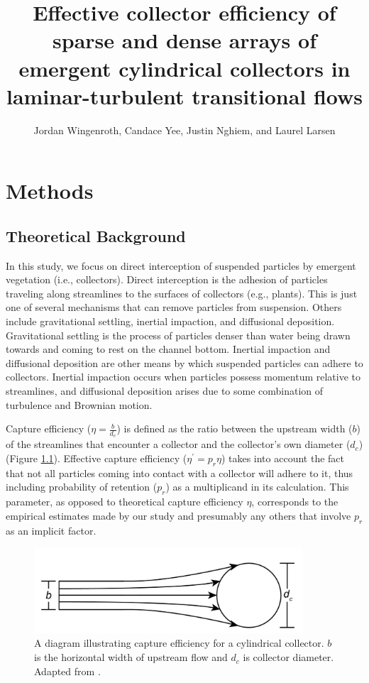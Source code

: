 \documentclass{scrreprt}
\author{Jordan Wingenroth, Candace Yee, Justin Nghiem, and Laurel Larsen}
\title{Effective collector efficiency of sparse and dense arrays of emergent cylindrical collectors in laminar-turbulent transitional flows}
\begin{document}
\maketitle

%

\setcounter{chapter}{1}

\chapter{Methods}

\section{Theoretical Background}

In this study, we focus on direct interception of suspended particles by emergent vegetation (i.e., collectors). Direct interception is the adhesion of particles traveling along streamlines to the surfaces of collectors (e.g., plants). This is just one of several mechanisms that can remove particles from suspension. Others include gravitational settling, inertial impaction, and diffusional deposition. Gravitational settling is the process of particles denser than water being drawn towards and coming to rest on the channel bottom. Inertial impaction and diffusional deposition are other means by which suspended particles can adhere to collectors. Inertial impaction occurs when particles possess momentum relative to streamlines, and diffusional deposition arises due to some combination of turbulence and Brownian motion.

Capture efficiency ($\eta=\frac{b}{d_c}$) is defined as the ratio between the upstream width ($b$) of the streamlines that encounter a collector and the collector's own diameter ($d_c$) (Figure \ref{fig:capeff}). Effective capture efficiency ($\eta^\prime=p_r\eta$) takes into account the fact that not all particles coming into contact with a collector will adhere to it, thus including probability of retention ($p_r$) as a multiplicand in its calculation. This parameter, as opposed to theoretical capture efficiency $\eta$, corresponds to the empirical estimates made by our study and presumably any others that involve $p_r$ as an implicit factor.

\begin{figure}[htbp]
\includegraphics[width=10cm]{collectorefficiency.png}
\centering
\caption{A diagram illustrating capture efficiency for a cylindrical collector. $b$ is the horizontal width of upstream flow and $d_c$ is collector diameter. Adapted from \cite{Palmer_2004}.}
\label{fig:capeff}
\end{figure}
\end{document}
